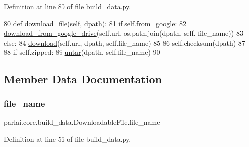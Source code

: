 Definition at line 80 of file build\+\_\+data.\+py.


\begin{DoxyCode}
80     \textcolor{keyword}{def }download\_file(self, dpath):
81         \textcolor{keywordflow}{if} self.from\_google:
82             \hyperlink{namespaceparlai_1_1core_1_1build__data_ac9224da5c4e4ce9d1f4ab05e837c1f45}{download\_from\_google\_drive}(self.url, os.path.join(dpath, self.
      file\_name))
83         \textcolor{keywordflow}{else}:
84             \hyperlink{namespaceparlai_1_1core_1_1build__data_ab74f0e428f05e5d91fa93c8afb367622}{download}(self.url, dpath, self.file\_name)
85 
86         self.checksum(dpath)
87 
88         \textcolor{keywordflow}{if} self.zipped:
89             \hyperlink{namespaceparlai_1_1core_1_1build__data_a4d33f97932682a8513904022d852f3cf}{untar}(dpath, self.file\_name)
90 
\end{DoxyCode}


\subsection{Member Data Documentation}
\mbox{\label{classparlai_1_1core_1_1build__data_1_1DownloadableFile_aa4d0b0712e8e33759cd55024eae74958}} 
\subsubsection{\texorpdfstring{file\+\_\+name}{file\_name}}
{\footnotesize\ttfamily parlai.\+core.\+build\+\_\+data.\+Downloadable\+File.\+file\+\_\+name}



Definition at line 56 of file build\+\_\+data.\+py.

\mbox{\label{classparlai_1_1core_1_1build__data_1_1DownloadableFile_a7217a744f70ba99fac9306eea01c5a08}} 

